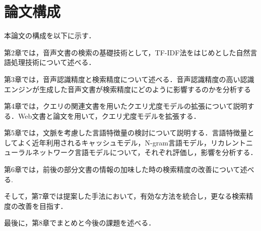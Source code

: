 \section{論文構成}
\noindent
本論文の構成を以下に示す．

第2章では，音声文書の検索の基礎技術として，TF-IDF法をはじめとした自然言語処理技術について述べる．

第3章では，音声認識精度と検索精度について述べる．音声認識精度の高い認識エンジンが生成した音声文書が検索精度にどのように影響するのかを分析する 

第4章では，クエリの関連文書を用いたクエリ尤度モデルの拡張について説明する．Web文書と論文を用いて，クエリ尤度モデルを拡張する．

第5章では，文脈を考慮した言語特徴量の検討について説明する．言語特徴量としてよく近年利用されるキャッシュモデル，N-gram言語モデル，リカレントニューラルネットワーク言語モデルについて，それぞれ評価し，影響を分析する．

第6章では，前後の部分文書の情報の加味した時の検索精度の改善について述べる. 

そして，第7章では提案した手法において，有効な方法を統合し，更なる検索精度の改善を目指す． 

最後に，第8章でまとめと今後の課題を述べる．

